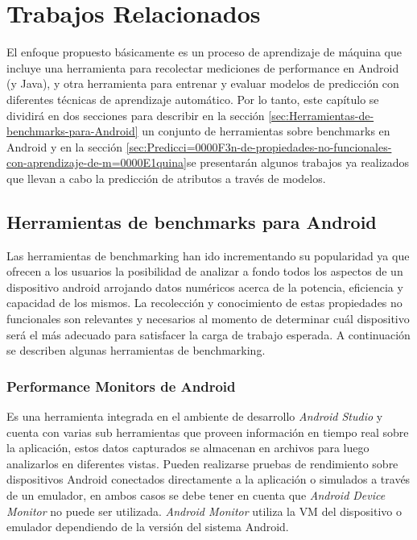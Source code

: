 
\chapter{Trabajos Relacionados\label{chap:Trabajos-Relacionados}}

El enfoque propuesto básicamente es un proceso de aprendizaje de máquina
que incluye una herramienta para recolectar mediciones de performance
en Android (y Java), y otra herramienta para entrenar y evaluar modelos
de predicción con diferentes técnicas de aprendizaje automático. Por
lo tanto, este capítulo se dividirá en dos secciones para describir
en la sección \ref{sec:Herramientas-de-benchmarks-para-Android} un
conjunto de herramientas sobre benchmarks en Android y en la sección
\ref{sec:Predicci=0000F3n-de-propiedades-no-funcionales-con-aprendizaje-de-m=0000E1quina}se
presentarán algunos trabajos ya realizados que llevan a cabo la predicción
de atributos a través de modelos.


\section{Herramientas de benchmarks para Android\label{sec:Herramientas-de-benchmarks-para-Android}}

Las herramientas de benchmarking han ido incrementando su popularidad
ya que ofrecen a los usuarios la posibilidad de analizar a fondo todos
los aspectos de un dispositivo android arrojando datos numéricos acerca
de la potencia, eficiencia y capacidad de los mismos. La recolección
y conocimiento de estas propiedades no funcionales son relevantes
y necesarios al momento de determinar cuál dispositivo será el más
adecuado para satisfacer la carga de trabajo esperada. A continuación
se describen algunas herramientas de benchmarking. 


\subsection{Performance Monitors de Android \label{sub:Performance-Monitors-de-Android }}

Es una herramienta integrada en el ambiente de desarrollo \emph{Android
Studio} y cuenta con varias sub herramientas que proveen información
en tiempo real sobre la aplicación, estos datos capturados se almacenan
en archivos para luego analizarlos en diferentes vistas. Pueden realizarse
pruebas de rendimiento sobre dispositivos Android conectados directamente
a la aplicación o simulados a través de un emulador, en ambos casos
se debe tener en cuenta que \emph{Android Device Monitor }no puede
ser utilizada. \emph{Android Monitor} utiliza la \ac{VM} del dispositivo
o emulador dependiendo de la versión del sistema Android. 

